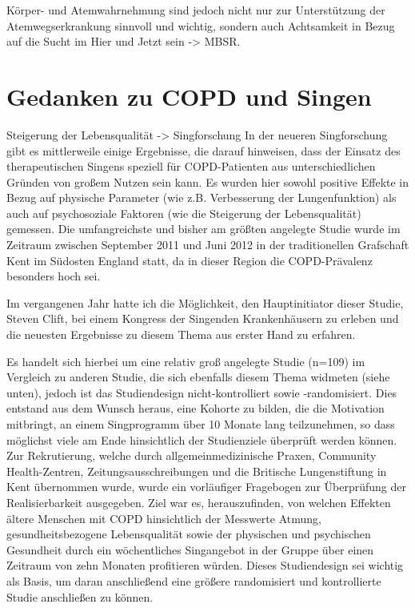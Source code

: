 Körper- und Atemwahrnehmung sind jedoch nicht nur zur Unterstützung der Atemwegserkrankung sinnvoll und wichtig, sondern auch Achtsamkeit in Bezug auf die Sucht im Hier und Jetzt sein -> MBSR.

\section{Gedanken zu COPD und Singen}
Steigerung der Lebensqualität -> Singforschung
In der neueren Singforschung gibt es mittlerweile einige Ergebnisse, die darauf hinweisen, dass der Einsatz des therapeutischen Singens speziell für COPD-Patienten aus unterschiedlichen Gründen von großem Nutzen sein kann. Es wurden hier sowohl positive Effekte in Bezug auf physische Parameter (wie z.B. Verbesserung der Lungenfunktion) als auch auf psychosoziale Faktoren (wie die Steigerung der Lebensqualität) gemessen. Die umfangreichste und bisher am größten angelegte Studie wurde im Zeitraum zwischen September 2011 und Juni 2012 in der traditionellen Grafschaft Kent im Südosten England statt, da in dieser Region die COPD-Prävalenz besonders hoch sei.

Im vergangenen Jahr hatte ich die Möglichkeit, den Hauptinitiator dieser Studie, Steven Clift, bei einem Kongress der Singenden Krankenhäusern zu erleben und die neuesten Ergebnisse zu diesem Thema aus erster Hand zu erfahren.

Es handelt sich hierbei um eine relativ groß angelegte Studie (n=109) im Vergleich zu anderen Studie, die sich ebenfalls diesem Thema widmeten (siehe unten), jedoch ist das Studiendesign nicht-kontrolliert sowie -randomisiert. Dies entstand aus dem Wunsch heraus, eine Kohorte zu bilden, die die Motivation mitbringt, an einem Singprogramm über 10 Monate lang teilzunehmen, so dass möglichst viele am Ende hinsichtlich der Studienziele überprüft werden können. Zur Rekrutierung, welche durch allgemeinmedizinische Praxen, Community Health-Zentren, Zeitungsausschreibungen und die Britische Lungenstiftung in Kent übernommen wurde, wurde ein vorläufiger Fragebogen zur Überprüfung der Realisierbarkeit ausgegeben. Ziel war es, herauszufinden, von welchen Effekten ältere Menschen mit COPD hinsichtlich der Messwerte Atmung, gesundheitsbezogene Lebensqualität sowie der physischen und psychischen Gesundheit durch ein wöchentliches Singangebot in der Gruppe über einen Zeitraum von zehn Monaten profitieren würden. Dieses Studiendesign sei wichtig als Basis, um daran anschließend eine größere randomisiert und kontrollierte Studie anschließen zu können. 



